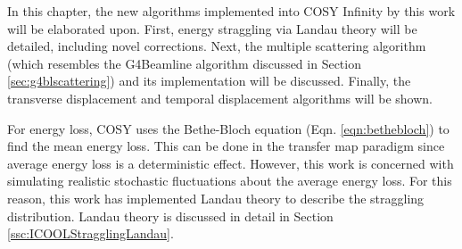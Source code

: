 In this chapter, the new algorithms implemented into COSY Infinity by this work will be elaborated upon. First, energy straggling via Landau theory will be detailed, including novel corrections. Next, the multiple scattering algorithm (which resembles the G4Beamline algorithm discussed in Section \ref{sec:g4blscattering}) and its implementation will be discussed. Finally, the transverse displacement and temporal displacement algorithms will be shown.

 \label{sec:COSYStraggling}\par
For energy loss, COSY uses the Bethe-Bloch equation (Eqn. \ref{eqn:bethebloch}) to find the mean energy loss. This can be done in the transfer map paradigm since average energy loss is a deterministic effect. However, this work is concerned with simulating realistic stochastic fluctuations about the average energy loss. For this reason, this work has implemented Landau theory \cite{landau} to describe the straggling distribution. Landau theory is discussed in detail in Section \ref{ssc:ICOOLStragglingLandau}. 

